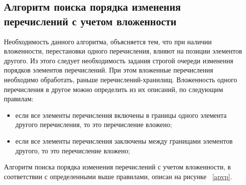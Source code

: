 \documentclass[a4paper,english,russian]{G2-105}
\begin{document}
\subsection{Алгоритм поиска порядка изменения перечислений с учетом вложенности}

\par Необходимость данного алгоритма, объясняется тем, что при наличии вложенности, перестановки одного перечисления, влияют на позиции элементов другого. Из этого следует необходимость задания строгой очереди изменения порядков элементов перечислений. При этом вложенные перечисления необходимо обработать, раньше перечислений-хранилищ. Вложенность одного перечисления в другое можно определить из их описаний, по следующим правилам:
\begin{itemize}
    \item если все элементы перечисления включены в границы одного элемента другого перечисления, то это перечисление вложено;
    \item если все элементы перечисления заключены между границами элементов другого, то это перечисление вложено;
\end{itemize}

\par Алгоритм поиска порядка изменения перечислений с учетом вложенности, в соответствии с определенными выше правилами, описан на рисунке ~\ref{apvp}.
\end{document}
